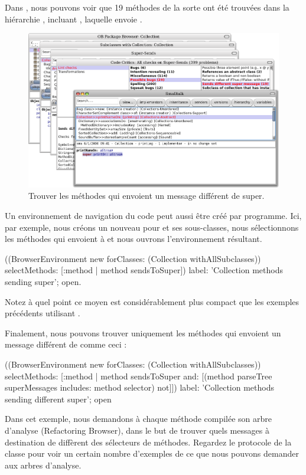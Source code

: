 \documentclass[a4paper,10pt,twoside]{book}
\begin{document}
Dans , nous pouvons voir que 19 méthodes de la sorte ont été trouvées dans la hiérarchie , incluant , laquelle envoie .
\begin{figure}[ht]\centering
	\includegraphics[width=\linewidth]{sendDifferentSuper}
	\caption{Trouver les méthodes qui envoient un message différent de super.
 	}
\end{figure}

Un environnement de navigation du code peut aussi être créé par programme.
Ici, par exemple, nous créons un nouveau  pour  et ses sous-classes, nous sélectionnons les méthodes qui envoient à \super et nous ouvrons l'environnement résultant.
\begin{code}{}
((BrowserEnvironment new forClasses: (Collection withAllSubclasses))
	selectMethods: [:method | method sendsToSuper])
	label: 'Collection methods sending super';
	open.
\end{code}{}

Notez à quel point ce moyen est considérablement plus compact que les exemples précédents utilisant .

Finalement, nous pouvons trouver uniquement les méthodes qui envoient un message différent de \super comme ceci :
\begin{code}{}
((BrowserEnvironment new forClasses: (Collection withAllSubclasses))
	selectMethods: [:method | 
		method sendsToSuper
		and: [(method parseTree superMessages includes: method selector) not]])
	label: 'Collection methods sending different super';
	open
\end{code}
Dans cet exemple, nous demandons à chaque méthode compilée son arbre d'analyse (Refactoring Browser), dans le but de trouver quels messages à destination de \super diffèrent des sélecteurs de méthodes.
Regardez le protocole  de la classe  pour voir un certain nombre d'exemples de ce que nous pouvons demander aux arbres d'analyse. 
\end{document}
